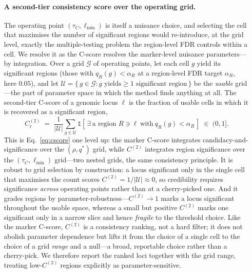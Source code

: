 \documentclass[11pt]{article}
\newcommand{\tauc}{\ensuremath{\tau_C}}
\newcommand{\lmin}{\ensuremath{\ell_{\min}}}
\begin{document}
\paragraph{A second-tier consistency score over the operating grid.}
The operating point $(\tauc, \lmin)$ is itself a nuisance choice, and selecting the
cell that maximises the number of significant regions would re-introduce, at the grid
level, exactly the multiple-testing problem the region-level FDR controls within a
cell. We resolve it as the C-score resolves the marker-level nuisance parameters---by
integration. Over a grid $\mathcal{G}$ of operating points, let each cell $g$ yield
its significant regions (those with $q_R(g) < \alpha_R$ at a region-level FDR target
$\alpha_R$, here $0.05$), and let
$\mathcal{U} = \{\, g \in \mathcal{G} : g \text{ yields}\ge 1 \text{ significant region}\,\}$
be the \emph{usable} grid---the part of parameter space in which the method finds
anything at all. The second-tier C-score of a genomic locus $\ell$ is the fraction of
usable cells in which it is recovered as a significant region,
\begin{equation}
  C^{(2)}_\ell \;=\; \frac{1}{|\mathcal{U}|} \sum_{g \in \mathcal{U}}
    \mathbb{1}\!\left[\,\exists\ \text{a region } R \ni \ell \ \text{with}\ q_R(g) < \alpha_R \,\right]
    \;\in\; (0, 1].
  \label{eq:cscore2}
\end{equation}
This is Eq.~\ref{eq:cscore} one level up: the marker C-score integrates
candidacy-and-significance over the $(\rho, q^*)$ grid, while $C^{(2)}$ integrates
region significance over the $(\tauc, \lmin)$ grid---two nested grids, the same
consistency principle. It is robust to grid selection by construction: a locus
significant only in the single cell that maximises the count scores
$C^{(2)} = 1/|\mathcal{U}| \approx 0$, so credibility requires significance
\emph{across} operating points rather than at a cherry-picked one. And it grades
regions by parameter-robustness---$C^{(2)} \to 1$ marks a locus significant
throughout the usable space, whereas a small but positive $C^{(2)}$ marks one
significant only in a narrow slice and hence \emph{fragile} to the threshold choice.
Like the marker C-score, $C^{(2)}$ is a consistency ranking, not a hard filter; it
does not abolish parameter dependence but lifts it from the choice of a single cell
to the choice of a grid \emph{range} and a null---a broad, reportable choice rather
than a cherry-pick. We therefore report the ranked loci together with the grid range,
treating low-$C^{(2)}$ regions explicitly as parameter-sensitive.
\end{document}
